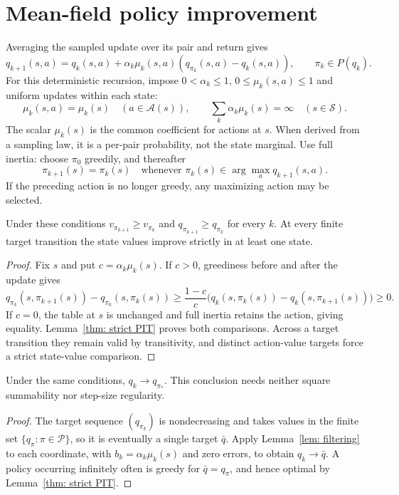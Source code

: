\section{Mean-field policy improvement}
\label{sec: mean field}
Averaging the sampled update over its pair and return gives
\begin{equation}\label{eq: deterministic mcopi}
q_{k+1}(s,a)=q_k(s,a)+\alpha_k\mu_k(s,a)(q_{\pi_k}(s,a)-q_k(s,a)),\qquad\pi_k\in P(q_k).
\end{equation}
For this deterministic recursion, impose $0<\alpha_k\le1$, $0\le\mu_k(s,a)\le1$ and uniform updates within each state:
\begin{equation}\label{asp: unbiased over policies}
\mu_k(s,a)=\mu_k(s)\quad(a\in\mathcal A(s)),\qquad
\sum_k\alpha_k\mu_k(s)=\infty\quad(s\in\mathcal S).
\end{equation}
The scalar $\mu_k(s)$ is the common coefficient for actions at $s$. When derived from a sampling law, it is a per-pair probability, not the state marginal. Use full inertia: choose $\pi_0$ greedily, and thereafter
\begin{equation}\label{eq:greedy-pol-tie-breaking}
\pi_{k+1}(s)=\pi_k(s)\quad\text{whenever }\pi_k(s)\in\arg\max_a q_{k+1}(s,a).
\end{equation}
If the preceding action is no longer greedy, any maximizing action may be selected.

\begin{proposition}\label{thm: improving policies}
Under these conditions $v_{\pi_{k+1}}\ge v_{\pi_k}$ and $q_{\pi_{k+1}}\ge q_{\pi_k}$ for every $k$. At every finite target transition the state values improve strictly in at least one state.
\end{proposition}
\begin{proof}
Fix $s$ and put $c=\alpha_k\mu_k(s)$. If $c>0$, greediness before and after the update gives
\[
q_{\pi_k}(s,\pi_{k+1}(s))-q_{\pi_k}(s,\pi_k(s))
\ge\frac{1-c}{c}\bigl(q_k(s,\pi_k(s))-q_k(s,\pi_{k+1}(s))\bigr)\ge0.
\]
If $c=0$, the table at $s$ is unchanged and full inertia retains the action, giving equality. Lemma~\ref{thm: strict PIT} proves both comparisons. Across a target transition they remain valid by transitivity, and distinct action-value targets force a strict state-value comparison.
\end{proof}

\begin{proposition}\label{thm: convergence deterministic mcopi}
Under the same conditions, $q_k\to q_{\pi_*}$. This conclusion needs neither square summability nor step-size regularity.
\end{proposition}
\begin{proof}
The target sequence $(q_{\pi_k})$ is nondecreasing and takes values in the finite set $\{q_\pi:\pi\in\mathcal P\}$, so it is eventually a single target $\bar q$. Apply Lemma~\ref{lem: filtering} to each coordinate, with $b_k=\alpha_k\mu_k(s)$ and zero errors, to obtain $q_k\to\bar q$. A policy occurring infinitely often is greedy for $\bar q=q_\pi$, and hence optimal by Lemma~\ref{thm: strict PIT}.
\end{proof}

